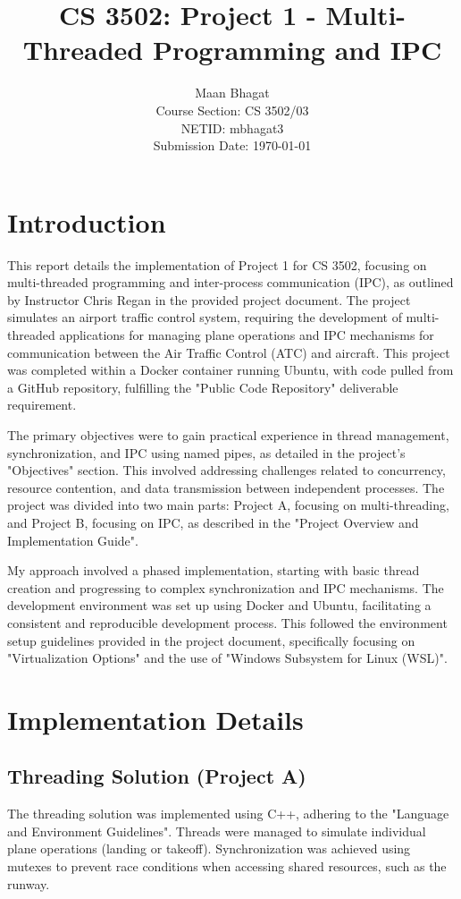 \documentclass{article}
\title{CS 3502: Project 1 - Multi-Threaded Programming and IPC}
\author{
    Maan Bhagat \\
    Course Section: CS 3502/03 \\
    NETID: mbhagat3 \\
    Submission Date: \today
}
\date{}
\begin{document}
\maketitle

\section{Introduction}
This report details the implementation of Project 1 for CS 3502, focusing on multi-threaded programming and inter-process communication (IPC), as outlined by Instructor Chris Regan in the provided project document. The project simulates an airport traffic control system, requiring the development of multi-threaded applications for managing plane operations and IPC mechanisms for communication between the Air Traffic Control (ATC) and aircraft. This project was completed within a Docker container running Ubuntu, with code pulled from a GitHub repository, fulfilling the "Public Code Repository" deliverable requirement.

The primary objectives were to gain practical experience in thread management, synchronization, and IPC using named pipes, as detailed in the project's "Objectives" section. This involved addressing challenges related to concurrency, resource contention, and data transmission between independent processes. The project was divided into two main parts: Project A, focusing on multi-threading, and Project B, focusing on IPC, as described in the "Project Overview and Implementation Guide".

My approach involved a phased implementation, starting with basic thread creation and progressing to complex synchronization and IPC mechanisms. The development environment was set up using Docker and Ubuntu, facilitating a consistent and reproducible development process. This followed the environment setup guidelines provided in the project document, specifically focusing on "Virtualization Options" and the use of "Windows Subsystem for Linux (WSL)".

\section{Implementation Details}

\subsection{Threading Solution (Project A)}
The threading solution was implemented using C++, adhering to the "Language and Environment Guidelines". Threads were managed to simulate individual plane operations (landing or takeoff). Synchronization was achieved using mutexes to prevent race conditions when accessing shared resources, such as the runway.
\end{document}
